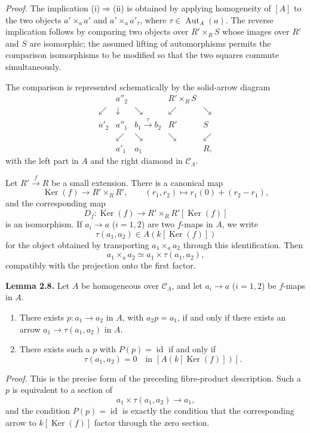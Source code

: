 \documentclass[11pt]{article}
\providecommand{\Aut}{\operatorname{Aut}}
\providecommand{\Ker}{\operatorname{Ker}}
\begin{document}
\emph{Proof.} The implication (i)\(\Rightarrow\)(ii) is obtained by applying homogeneity of
\([A]\) to the two objects \(a'\times_a a'\) and \(a'\times_a a'_\tau\), where
\(\tau\in\Aut_A(a)\). The reverse implication follows by comparing two objects over
\(R'\times_R S\) whose images over \(R'\) and \(S\) are isomorphic; the assumed lifting
of automorphisms permits the comparison isomorphisms to be modified so that the two
squares commute simultaneously.

The comparison is represented schematically by the solid-arrow diagram
\[
\begin{array}{ccccc}
 & a''_2 & & R'\times_R S &\\
 \swarrow & \downarrow & \searrow & \swarrow & \searrow\\
a'_2 & a''_1 & b_1 \xrightarrow{\tau} b_2 & R' & S\\
 & \swarrow & \searrow & \searrow & \swarrow\\
 & a'_1 & a_1 & & R ,
\end{array}
\]
with the left part in \(A\) and the right diamond in \(\mathcal C_\Lambda\).


Let \(R'\xrightarrow f R\) be a small extension. There is a canonical map
\[
 \Ker(f)\longrightarrow R'\times_R R',
\qquad
(r_1,r_2)\longmapsto r_1(0)+(r_2-r_1),
\]
and the corresponding map
\[
D_f:\Ker(f)\longrightarrow R'\times_R R'[\Ker(f)]
\]
is an isomorphism. If \(a_i\to a\) (\(i=1,2\)) are two \(f\)-maps in \(A\), we write
\[
 \tau(a_1,a_2)\in A(k[\Ker(f)])
\]
for the object obtained by transporting \(a_1\times_a a_2\) through this identification.
Then
\[
 a_1\times_a a_2\simeq a_1\times \tau(a_1,a_2),
\]
compatibly with the projection onto the first factor.

\textbf{Lemma 2.8.} Let \(A\) be homogeneous over \(\mathcal C_\Lambda\), and let
\(a_i\to a\) (\(i=1,2\)) be \(f\)-maps in \(A\).
\begin{enumerate}[label=(\arabic*)]
\item There exists \(p:a_1\to a_2\) in \(A\), with \(a_2p=a_1\), if and only if there exists
an arrow \(a_1\to\tau(a_1,a_2)\) in \(A\).
\item There exists such a \(p\) with \(P(p)=\operatorname{id}\) if and only if
\[
 \tau(a_1,a_2)=0\quad\text{in }[A(k[\Ker(f)])].
\]
\end{enumerate}

\emph{Proof.} This is the precise form of the preceding fibre-product description. Such a
\(p\) is equivalent to a section of
\[
 a_1\times\tau(a_1,a_2)\longrightarrow a_1,
\]
and the condition \(P(p)=\operatorname{id}\) is exactly the condition that the corresponding
arrow to \(k[\Ker(f)]\) factor through the zero section.
\end{document}
